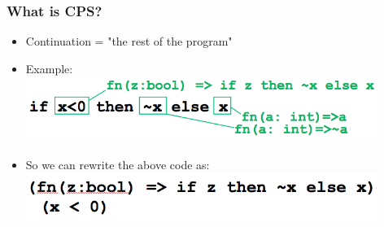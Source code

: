 \documentclass[14pt]{beamer}
\begin{document}
%
\begin{frame}[noframenumbering]
\frametitle{What is CPS?}
\begin{itemize}
\item Continuation = "the rest of the program"
\item Example:
\includegraphics[width=0.9\textwidth]{CPS1}
\pause
\item So we can rewrite the above code as:
\includegraphics[width=0.9\textwidth]{CPS2}

\end{itemize}
\end{frame}


%	
\end{document}
